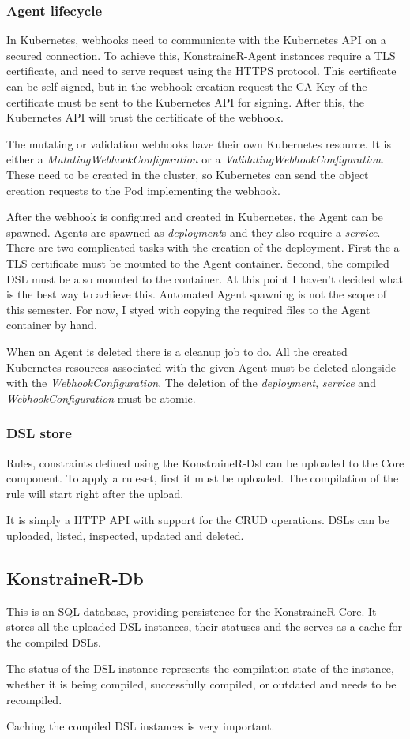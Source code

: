 \subsubsection{Agent lifecycle}

In Kubernetes, webhooks need to communicate with the Kubernetes API on a secured connection. To achieve this, KonstraineR-Agent instances require a TLS certificate, and need to serve request using the HTTPS protocol. This certificate can be self signed, but in the webhook creation request the CA Key of the certificate must be sent to the Kubernetes API for signing. After this, the Kubernetes API will trust the certificate of the webhook.

The mutating or validation webhooks have their own Kubernetes resource. It is either a \emph{MutatingWebhookConfiguration} or a \emph{ValidatingWebhookConfiguration}. These need to be created in the cluster, so Kubernetes can send the object creation requests to the Pod implementing the webhook.

After the webhook is configured and created in Kubernetes, the Agent can be spawned. Agents are spawned as \emph{deployment}s and they also require a \emph{service}. There are two complicated tasks with the creation of the deployment. First the a TLS certificate must be mounted to the Agent container. Second, the compiled DSL must be also mounted to the container. At this point I haven't decided what is the best way to achieve this. Automated Agent spawning is not the scope of this semester. For now, I styed with copying the required files to the Agent container by hand.

When an Agent is deleted there is a cleanup job to do. All the created Kubernetes resources associated with the given Agent must be deleted alongside with the \emph{WebhookConfiguration}. The deletion of the \emph{deployment}, \emph{service} and \emph{WebhookConfiguration} must be atomic.

\subsubsection{DSL store}

Rules, constraints defined using the KonstraineR-Dsl can be uploaded to the Core component. To apply a ruleset, first it must be uploaded. The compilation of the rule will start right after the upload.

It is simply a HTTP API with support for the CRUD operations. DSLs can be uploaded, listed, inspected, updated and deleted.

\subsection{KonstraineR-Db}

This is an SQL database, providing persistence for the KonstraineR-Core. It stores all the uploaded DSL instances, their statuses and the serves as a cache for the compiled DSLs.

The status of the DSL instance represents the compilation state of the instance, whether it is being compiled, successfully compiled, or outdated and needs to be recompiled.

Caching the compiled DSL instances is very important. 

